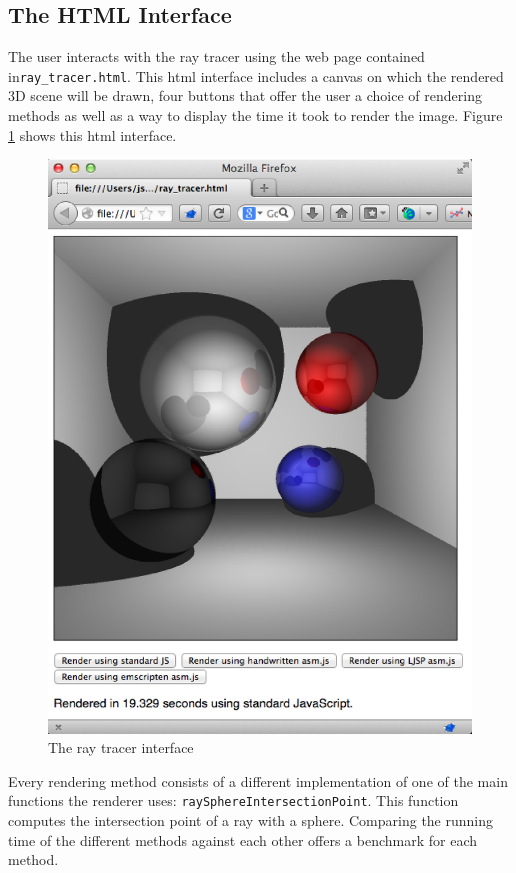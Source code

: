 \documentclass[11pt]{report}
\begin{document}
\subsection{The HTML Interface}
The user interacts with the ray tracer using the web page contained in\texttt{ray_tracer.html}. This html interface includes a canvas on which the rendered 3D scene will be drawn, four buttons that offer the user a choice of rendering methods as well as a way to display the time it took to render the image. Figure \ref{raytracinginterface} shows this html interface.

\begin{figure}[p]
\includegraphics[scale=0.7]{raytracinginterface.eps}
\caption{The ray tracer interface}
\label{raytracinginterface}
\end{figure}

Every rendering method consists of a different implementation of one of the main functions the renderer uses: \texttt{raySphereIntersectionPoint}. This function computes the intersection point of a ray with a sphere. Comparing the running time of the different methods against each other offers a benchmark for each method.
\end{document}
